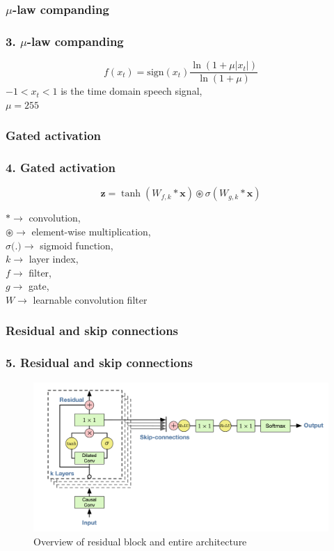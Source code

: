 \documentclass{beamer}
\begin{document}
  \subsubsection{$\mu$-law companding}
  \begin{frame}
    \frametitle{3. $\mu$-law companding}
    \centering
    \begin{equation*}
      f(x_t) = \text{sign}(x_t)\frac{\ln(1 + \mu|x_t|)}{\ln(1 + \mu)}
    \end{equation*}
    $-1 < x_t < 1$ is the time domain speech signal,\\
    $\mu = 255$
  \end{frame}

  \subsubsection{Gated activation}
  \begin{frame}
    \frametitle{4. Gated activation}
    \centering
    \begin{equation*}
      \mathbf{z} = \tanh(W_{f, k}*\mathbf{x}) \circledast \sigma (W_{g, k}*\mathbf{x})
    \end{equation*}
    \begin{flushleft}
    $* \rightarrow$ convolution,\\
    $\circledast \rightarrow$ element-wise multiplication,\\
    $\sigma\text{(.)} \rightarrow$ sigmoid function,\\
    $k \rightarrow$ layer index,\\
    $f \rightarrow$ filter,\\
    $g \rightarrow$ gate,\\
    $W \rightarrow$ learnable convolution filter
    \end{flushleft}
  \end{frame}

  \subsubsection{Residual and skip connections}
  \begin{frame}
    \frametitle{5. Residual and skip connections}
    \begin{figure}[ht]
      \includegraphics[width=\textwidth]{images/wavenet_arch_residual.png}
      \caption{Overview of residual block and entire architecture }
    \end{figure}
  \end{frame}
\end{document}
